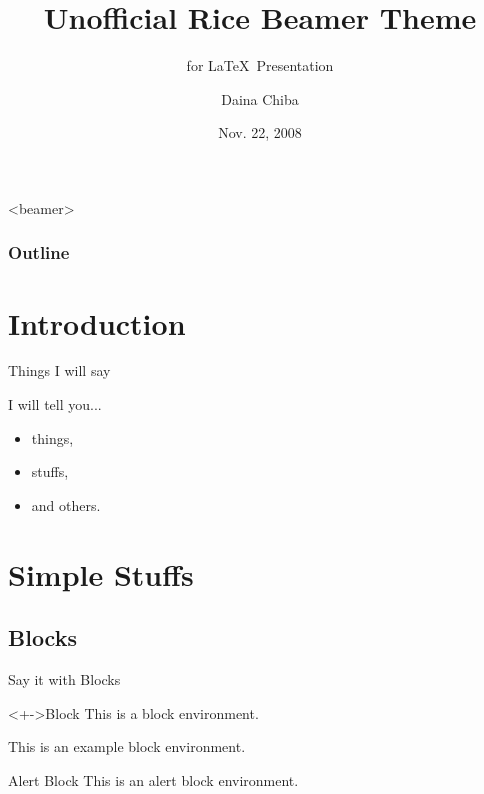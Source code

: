 \documentclass{beamer}
\title[RiceBeamer]
{Unofficial Rice Beamer Theme}
\subtitle
{for \LaTeX~Presentation}
\author[Chiba]{Daina Chiba}
\institute
{
  Department of Political Science
}
\date[11.22.2008]
{Nov. 22, 2008}
\begin{document}

\begin{frame}
 \titlepage
\end{frame}

\begin{frame}<beamer>
  \frametitle{Outline}
  \tableofcontents
\end{frame}

\section{Introduction}


\begin{frame}{Things I will say}

I will tell you...

    \begin{itemize}
    \item things,
    \item stuffs,
    \item and \alert{others}.
    \end{itemize}

\end{frame}

\section{Simple Stuffs}

\subsection{Blocks}

\begin{frame}{Say it with Blocks}

\begin{block}<+->{Block} 
This is a block environment.
\end{block}

\begin{example}
This is an example block environment.
\end{example}

 \begin{alertblock}{Alert Block}
This is an alert block environment.
\end{alertblock}

\end{frame}
\end{document}
